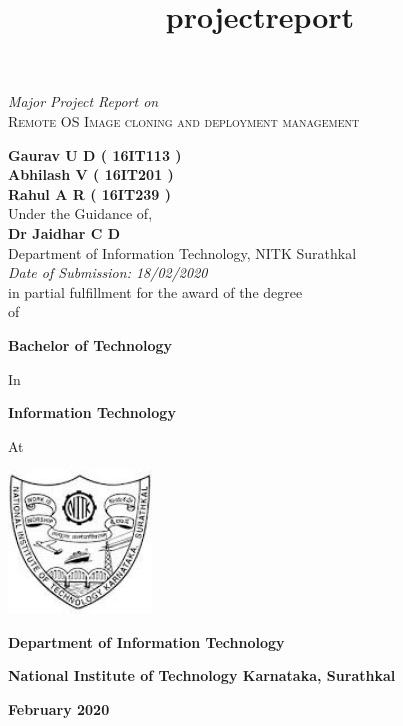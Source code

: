 \documentclass[a4paper,12pt]{article}
\title{projectreport}
\begin{document}
\thispagestyle{empty}
\begin{center}
\textit{Major Project Report on} \\
\vspace{2 mm}
\Large{\textsc{ Remote OS Image cloning and  deployment management }}   %

\vspace{7 mm}
\large{\textbf{                  %
Gaurav U D ( 16IT113 )  
\\Abhilash V ( 16IT201 )   
\\Rahul A R ( 16IT239 ) 
}}
\\
\vspace{4 mm}
Under the Guidance of,\\
\textbf{Dr Jaidhar C D}\\         %
Department of Information Technology, NITK Surathkal\\
\vspace{4 mm}
\textit{Date of Submission: 18/02/2020}
\\
\vspace{4 mm}
in partial fulfillment for the award of the degree
\\

of

\textbf{Bachelor of Technology}

In

\textbf{Information Technology}

At
\vspace{4 mm}
    
        \includegraphics[width=1.5in,height=1.5in]
        {nitk.jpg}
 
\textbf{Department of Information Technology}

\textbf{National Institute of Technology Karnataka, Surathkal}

\textbf{February 2020}
\end{center}

\end{document}
